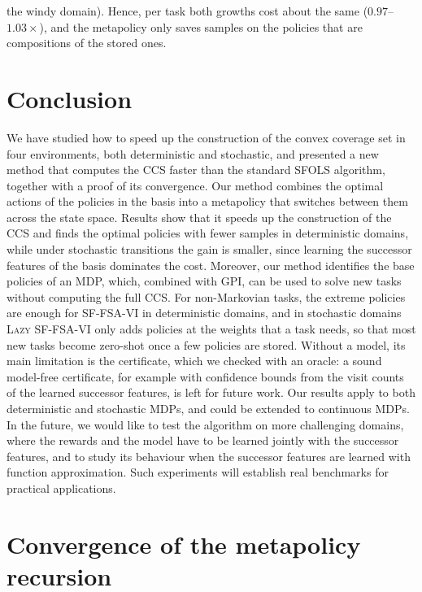 \documentclass[11pt]{article}
\begin{document}
the windy domain). Hence, per task both growths cost about the same ($0.97$--$1.03\times$), and the metapolicy only saves samples on the policies that are compositions of the stored ones.

\section{Conclusion}\label{sec:conclusions}

We have studied how to speed up the construction of the convex coverage set in four environments, both deterministic and stochastic, and presented a new method that computes the CCS faster than the standard SFOLS algorithm, together with a proof of its convergence. Our method combines the optimal actions of the policies in the basis into a metapolicy that switches between them across the state space. Results show that it speeds up the construction of the CCS and finds the optimal policies with fewer samples in deterministic domains, while under stochastic transitions the gain is smaller, since learning the successor features of the basis dominates the cost. Moreover, our method identifies the base policies of an MDP, which, combined with GPI, can be used to solve new tasks without computing the full CCS. For non-Markovian tasks, the extreme policies are enough for SF-FSA-VI in deterministic domains, and in stochastic domains \textsc{Lazy SF-FSA-VI} only adds policies at the weights that a task needs, so that most new tasks become zero-shot once a few policies are stored. Without a model, its main limitation is the certificate, which we checked with an oracle: a sound model-free certificate, for example with confidence bounds from the visit counts of the learned successor features, is left for future work. Our results apply to both deterministic and stochastic MDPs, and could be extended to continuous MDPs. In the future, we would like to test the algorithm on more challenging domains, where the rewards and the model have to be learned jointly with the successor features, and to study its behaviour when the successor features are learned with function approximation. Such experiments will establish real benchmarks for practical applications.

\appendix


\section{Convergence of the metapolicy recursion}\label{app:convergence}
\end{document}
